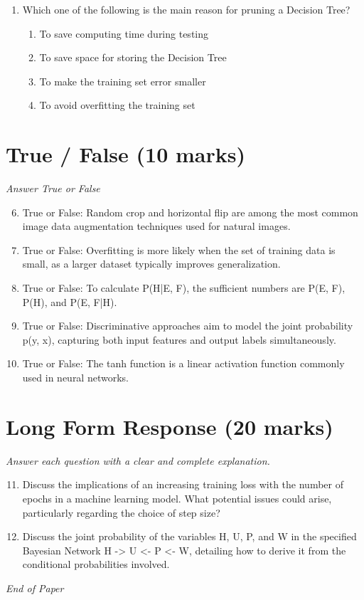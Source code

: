 \documentclass[12pt]{article}
\begin{document}
\begin{enumerate}[label=\arabic*.]
\begin{enumerate}[label=(\alph*)]
    \item False, True
\end{enumerate}
\item Which one of the following is the main reason for pruning a Decision Tree?
\begin{enumerate}[label=(\alph*)]
    \item To save computing time during testing
    \item To save space for storing the Decision Tree
    \item To make the training set error smaller
    \item To avoid overfitting the training set
\end{enumerate}
\end{enumerate}

\section*{True / False (10 marks)}
\textit{Answer True or False}
\begin{enumerate}[label=\arabic*.]
\setcounter{enumi}{5}
\item True or False: Random crop and horizontal flip are among the most common image data augmentation techniques used for natural images.
\item True or False: Overfitting is more likely when the set of training data is small, as a larger dataset typically improves generalization.
\item True or False: To calculate P(H|E, F), the sufficient numbers are P(E, F), P(H), and P(E, F|H).
\item True or False: Discriminative approaches aim to model the joint probability p(y, x), capturing both input features and output labels simultaneously.
\item True or False: The tanh function is a linear activation function commonly used in neural networks.
\end{enumerate}

\section*{Long Form Response (20 marks)}
\textit{Answer each question with a clear and complete explanation.}
\begin{enumerate}[label=\arabic*.]
\setcounter{enumi}{10}
\item Discuss the implications of an increasing training loss with the number of epochs in a machine learning model. What potential issues could arise, particularly regarding the choice of step size?
\item Discuss the joint probability of the variables H, U, P, and W in the specified Bayesian Network H -\textgreater{} U \textless{}- P \textless{}- W, detailing how to derive it from the conditional probabilities involved.
\end{enumerate}

\vfill
\noindent\textit{End of Paper}
\end{document}
